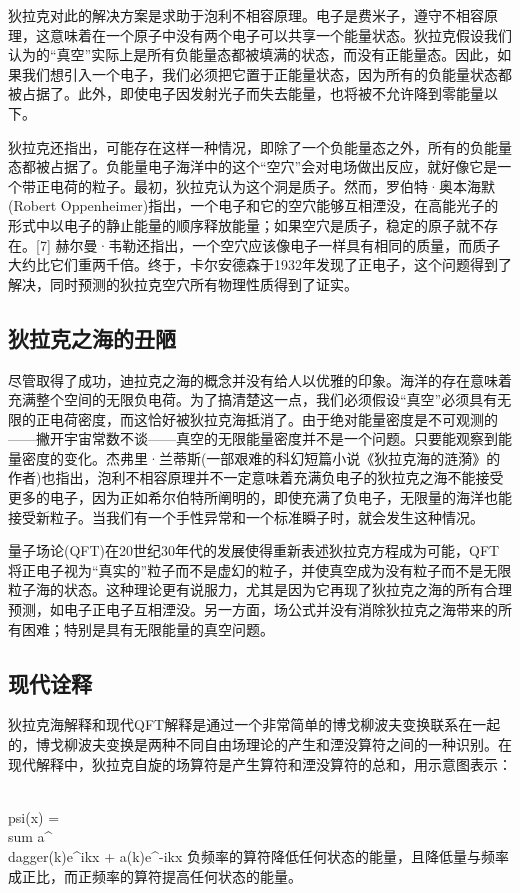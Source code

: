 狄拉克对此的解决方案是求助于泡利不相容原理。电子是费米子，遵守不相容原理，这意味着在一个原子中没有两个电子可以共享一个能量状态。狄拉克假设我们认为的“真空”实际上是所有负能量态都被填满的状态，而没有正能量态。因此，如果我们想引入一个电子，我们必须把它置于正能量状态，因为所有的负能量状态都被占据了。此外，即使电子因发射光子而失去能量，也将被不允许降到零能量以下。

狄拉克还指出，可能存在这样一种情况，即除了一个负能量态之外，所有的负能量态都被占据了。负能量电子海洋中的这个“空穴”会对电场做出反应，就好像它是一个带正电荷的粒子。最初，狄拉克认为这个洞是质子。然而，罗伯特·奥本海默(Robert Oppenheimer)指出，一个电子和它的空穴能够互相湮没，在高能光子的形式中以电子的静止能量的顺序释放能量；如果空穴是质子，稳定的原子就不存在。[7] 赫尔曼·韦勒还指出，一个空穴应该像电子一样具有相同的质量，而质子大约比它们重两千倍。终于，卡尔安德森于1932年发现了正电子，这个问题得到了解决，同时预测的狄拉克空穴所有物理性质得到了证实。

\subsection{狄拉克之海的丑陋}
尽管取得了成功，迪拉克之海的概念并没有给人以优雅的印象。海洋的存在意味着充满整个空间的无限负电荷。为了搞清楚这一点，我们必须假设“真空”必须具有无限的正电荷密度，而这恰好被狄拉克海抵消了。由于绝对能量密度是不可观测的——撇开宇宙常数不谈——真空的无限能量密度并不是一个问题。只要能观察到能量密度的变化。杰弗里·兰蒂斯(一部艰难的科幻短篇小说《狄拉克海的涟漪》的作者)也指出，泡利不相容原理并不一定意味着充满负电子的狄拉克之海不能接受更多的电子，因为正如希尔伯特所阐明的，即使充满了负电子，无限量的海洋也能接受新粒子。当我们有一个手性异常和一个标准瞬子时，就会发生这种情况。

量子场论(QFT)在20世纪30年代的发展使得重新表述狄拉克方程成为可能，QFT将正电子视为“真实的”粒子而不是虚幻的粒子，并使真空成为没有粒子而不是无限粒子海的状态。这种理论更有说服力，尤其是因为它再现了狄拉克之海的所有合理预测，如电子正电子互相湮没。另一方面，场公式并没有消除狄拉克之海带来的所有困难；特别是具有无限能量的真空问题。

\subsection{现代诠释}
狄拉克海解释和现代QFT解释是通过一个非常简单的博戈柳波夫变换联系在一起的，博戈柳波夫变换是两种不同自由场理论的产生和湮没算符之间的一种识别。在现代解释中，狄拉克自旋的场算符是产生算符和湮没算符的总和，用示意图表示：

\\psi(x) = \\sum a^\\dagger(k)e^{ikx} + a(k)e^{-ikx}
负频率的算符降低任何状态的能量，且降低量与频率成正比，而正频率的算符提高任何状态的能量。

